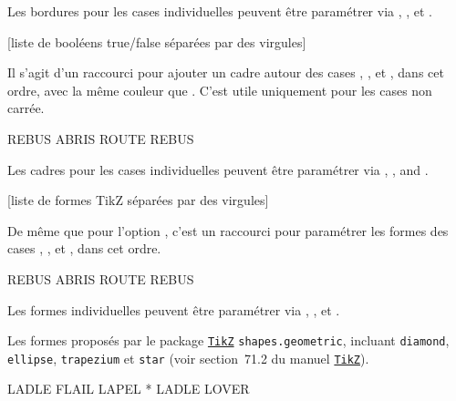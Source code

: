 \documentclass[svgnames]{report}
\newcommand\ctan[1]{\href{https://www.ctan.org/pkg/#1}{\texttt{#1}}}
\begin{document}
  Les bordures pour les cases individuelles peuvent être paramétrer via 
  , ,  et .

  [liste de booléens true/false séparées par des virgules]

  Il s'agit d'un raccourci pour ajouter un cadre autour des cases , ,  et , dans cet ordre, avec la même couleur que . C'est utile uniquement pour les cases non carrée.

  \begin{example}
  \begin{wordle}[Cadres={false,true,true},Formes=circle]{REBUS}
    ABRIS
    ROUTE
    REBUS
  \end{wordle}
  \end{example}

  Les cadres pour les cases individuelles peuvent être paramétrer via , ,
   and .

  [liste de formes TikZ séparées par des virgules]

  De même que pour l'option , c'est un raccourci pour paramétrer les formes des cases , ,
   et , dans cet ordre.

  \begin{example}
  \begin{wordle}[Formes={circle, rectangle, circle}]{REBUS}
    ABRIS
    ROUTE
    REBUS
  \end{wordle}
  \end{example}

  Les formes individuelles peuvent être paramétrer via , ,
   et .
  
  Les formes proposés par le package \ctan{TikZ}
  \texttt{shapes.geometric}, incluant \texttt{diamond},
  \texttt{ellipse}, \texttt{trapezium} et \texttt{star} (voir section~71.2 du manuel \ctan{TikZ}).

  \begin{example}
  \begin{wordle}[Formes={diamond,ellipse,star}]{LADLE}
     FLAIL
     LAPEL
     *
     LADLE
     LOVER
  \end{wordle}
  \end{example}
\end{document}
